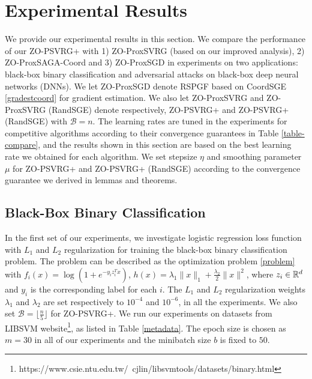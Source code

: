 \section{Experimental Results}
We provide our experimental results in this section. We compare the performance of
our ZO-PSVRG+  with 1) ZO-ProxSVRG (based on our improved analysis), 2) ZO-ProxSAGA-Coord \cite{gu2018faster} and 3) ZO-ProxSGD \cite{ghadimi2016accelerated} in experiments on two applications: black-box binary classification and adversarial attacks on black-box deep neural networks
(DNNs). We let ZO-ProxSGD denote RSPGF based on CoordSGE \eqref{gradestcoord} for gradient estimation. We also let ZO-ProxSVRG and ZO-ProxSVRG (RandSGE) denote respectively, ZO-PSVRG+  and ZO-PSVRG+ (RandSGE) with $\mathcal{B} = n$. The learning rates are tuned in the experiments for competitive algorithms according to their convergence guarantees in Table \ref{table-compare}, and the results shown in this section are based on the best learning rate we obtained for each algorithm. We set stepsize $\eta$ and smoothing parameter $\mu$ for ZO-PSVRG+ and ZO-PSVRG+ (RandSGE) according to the convergence guarantee we derived in lemmas and theorems.
\subsection{Black-Box Binary Classification}
In the first set of our experiments, we investigate logistic regression loss function with $L_1$ and $L_2$ regularization for training the black-box binary classification problem. The problem can be described as the optimization problem \eqref{problem} with $f_i(x) = \log(1+e^{-y_iz^T_i{x}})$, $h(x) = \lambda_1\|{x}\|_1 + \frac{\lambda_2}{2}\|{x}\|^2$, where $z_i\in\mathbb{R}^d$ and $y_i$ is the corresponding label for each $i$. The $L_1$ and $L_2$ regularization weights $\lambda_1$ and $\lambda_2$ are set respectively to $10^{-4}$ and $10^{-6}$, in all the experiments. We also set $\mathcal{B} = \lfloor{\frac{n}{5}}\rfloor$ for ZO-PSVRG+. We run our experiments on datasets from LIBSVM website{\footnote{https://www.csie.ntu.edu.tw/~cjlin/libsvmtools/datasets/binary.html}}, as listed in Table \ref{metadata}. The epoch size  is chosen as $m = 30$ in all of our experiments and the minibatch size  $b$ is fixed to $50$. 
 
